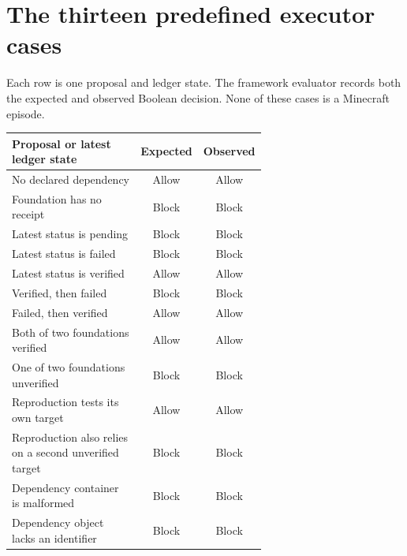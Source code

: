 \documentclass{article}
\begin{document}
\clearpage
\section{The thirteen predefined executor cases}\label{app:policy}
Each row is one proposal and ledger state. The framework evaluator records both the expected and observed Boolean decision. None of these cases is a Minecraft episode.
\begin{center}\small
\begin{tabular}{p{0.64\linewidth}cc}
\toprule
Proposal or latest ledger state & Expected & Observed\\
\midrule
No declared dependency & Allow & Allow\\
Foundation has no receipt & Block & Block\\
Latest status is pending & Block & Block\\
Latest status is failed & Block & Block\\
Latest status is verified & Allow & Allow\\
Verified, then failed & Block & Block\\
Failed, then verified & Allow & Allow\\
Both of two foundations verified & Allow & Allow\\
One of two foundations unverified & Block & Block\\
Reproduction tests its own target & Allow & Allow\\
Reproduction also relies on a second unverified target & Block & Block\\
Dependency container is malformed & Block & Block\\
Dependency object lacks an identifier & Block & Block\\
\bottomrule
\end{tabular}
\end{center}
\end{document}
